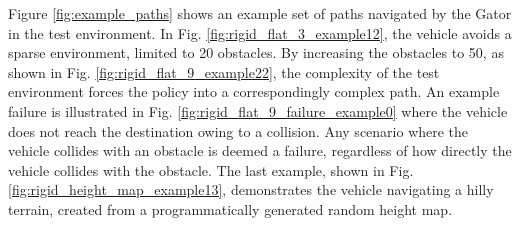Figure \ref{fig:example_paths} shows an example set of paths navigated by the Gator in the test environment. In Fig. \ref{fig:rigid_flat_3_example12}, the vehicle avoids a sparse environment, limited to 20 obstacles. By increasing the obstacles to 50, as shown in Fig. \ref{fig:rigid_flat_9_example22}, the complexity of the test environment forces the policy into a correspondingly complex path. An example failure is illustrated in Fig. \ref{fig:rigid_flat_9_failure_example0} where the vehicle does not reach the destination owing to a collision. Any scenario where the vehicle collides with an obstacle is deemed a failure, regardless of how directly the vehicle collides with the obstacle. The last example, shown in Fig. \ref{fig:rigid_height_map_example13}, demonstrates the vehicle navigating a hilly terrain, created from a programmatically generated random height map.


